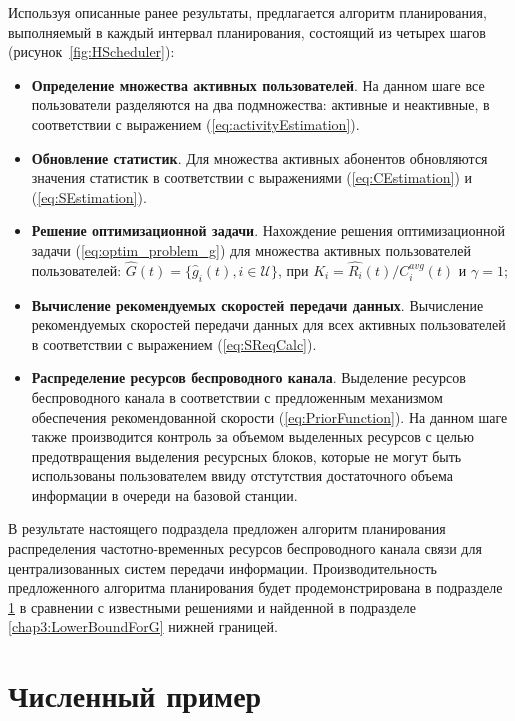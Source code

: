 Используя описанные ранее результаты, предлагается алгоритм планирования, выполняемый в каждый интервал планирования, состоящий из четырех шагов (рисунок~\ref{fig:HScheduler}):
\begin{itemize}
	\item \textbf{Определение множества активных пользователей}. На данном шаге все пользователи разделяются на два подмножества: активные и неактивные, в соответствии с выражением (\ref{eq:activityEstimation}).
	\item \textbf{Обновление статистик}. Для множества активных абонентов обновляются значения статистик в соответствии с выражениями (\ref{eq:CEstimation}) и (\ref{eq:SEstimation}).
	\item \textbf{Решение оптимизационной задачи}. Нахождение решения оптимизационной задачи (\ref{eq:optim_problem_g}) для множества активных пользователей пользователей: $\hat{G}(t) = \{\hat{g}_i(t), i \in \mathcal{U}\}$, при $K_i = \hat{R_i}(t) / C^{avg}_i(t)$ и $\gamma = 1$;
	\item \textbf{Вычисление рекомендуемых скоростей передачи данных}. Вычисление рекомендуемых скоростей передачи данных для всех активных пользователей в соответствии с выражением (\ref{eq:SReqCalc}).
	\item \textbf{Распределение ресурсов беспроводного канала}. Выделение ресурсов беспроводного канала в соответствии с предложенным механизмом обеспечения рекомендованной скорости (\ref{eq:PriorFunction}). На данном шаге также производится контроль за объемом выделенных ресурсов с целью предотвращения выделения ресурсных блоков, которые не могут быть использованы пользователем ввиду отстутствия достаточного объема информации в очереди на базовой станции.
\end{itemize}

В результате настоящего подраздела предложен алгоритм планирования распределения частотно-временных ресурсов беспроводного канала связи для централизованных систем передачи информации. Производительность предложенного алгоритма планирования будет продемонстрирована в подразделе \ref{chap3:NumericalExample} в сравнении с известными решениями и найденной в подразделе \ref{chap3:LowerBoundForG} нижней границей.

\section{Численный пример}
\label{chap3:NumericalExample}

